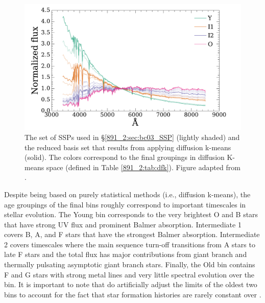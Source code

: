 
\begin{figure}
  \centering
  \includegraphics[width=\columnwidth]{891_2/figs/bc_dfk_comp.pdf}
  \caption[Comparison of full BC03 and diffusion k-means
    spectra]{\fixspacing\label{891_2:fig:bc_dfk_comp}The set of
     SSPs used in \S\ref{891_2:sec:bc03_SSP}
    (lightly shaded) and the reduced basis set that results from
    applying diffusion k-means (solid). The colors correspond to the
    final groupings in diffusion K-means space (defined in Table
    \ref{891_2:tab:dfk}). Figure adapted from .}
\end{figure}

Despite being based on purely statistical methods (i.e., diffusion
k-means), the age groupings of the final bins roughly correspond to
important timescales in stellar evolution. The Young bin corresponds
to the very brightest O and B stars that have strong UV flux and
prominent Balmer absorption. Intermediate 1 covers B, A, and F stars
that have the strongest Balmer absorption. Intermediate 2 covers
timescales where the main sequence turn-off transitions from A stars
to late F stars and the total flux has major contributions from giant
branch and thermally pulsating asymptotic giant branch stars. Finally,
the Old bin contains F and G stars with strong metal lines and very
little spectral evolution over the bin. It is important to note that
 do artificially adjust the limits of the oldest
two bins to account for the fact that star formation histories are
rarely constant over .

